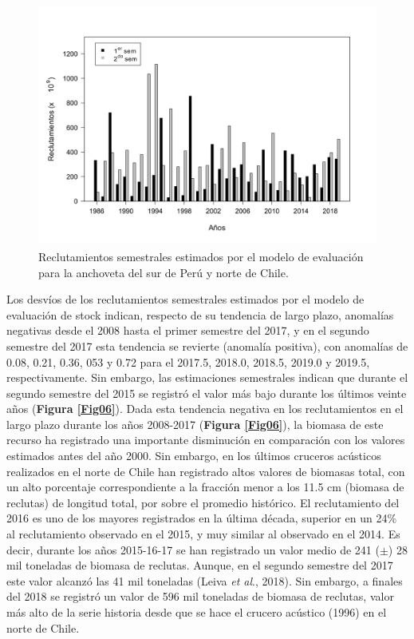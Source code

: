 \documentclass[letter,11pt]{article}
\begin{document}
\vspace{0.5cm}
\begin{figure}[htb!]
 \centering
 \includegraphics[width=12cm,height=8cm]{fig/figura05.pdf}
 \caption{Reclutamientos semestrales estimados por el modelo de evaluaci\'on para la 
 anchoveta del sur de Per\'u y norte de Chile.}
 \label{Fig05}
\end{figure}
\vspace{0.5cm}


Los desv\'ios de los reclutamientos semestrales estimados por el modelo de evaluaci\'on
de stock indican, respecto de su tendencia de largo plazo, anomal\'ias negativas desde
el 2008 hasta el primer semestre del 2017, y en el segundo semestre del 2017 esta tendencia
se revierte (anomal\'ia positiva), con anomal\'ias de 0.08, 0.21, 0.36, 053 y 0.72 para el
2017.5, 2018.0, 2018.5, 2019.0 y 2019.5, respectivamente. Sin embargo, las estimaciones
semestrales indican que durante el segundo semestre del 2015 se registr\'o el valor m\'as bajo
durante los \'ultimos veinte a\~{n}os (\textbf{Figura \ref{Fig06}}). Dada esta tendencia negativa
en los reclutamientos en el largo plazo durante los a\~{n}os 2008-2017 (\textbf{Figura \ref{Fig06}}),
la biomasa de este recurso ha registrado una importante disminuci\'on en comparaci\'on con los
valores estimados antes del a\~{n}o 2000. Sin embargo, en los \'ultimos cruceros ac\'usticos
realizados en el norte de Chile han registrado altos valores de biomasas total, con un alto
porcentaje correspondiente a la fracci\'on menor a los 11.5 cm
(biomasa de reclutas) de longitud total, por sobre el promedio hist\'orico. El reclutamiento del 2016
es uno de los mayores registrados en la \'ultima d\'ecada, superior en un 24\% al reclutamiento observado en el 2015, y muy similar al observado en el 2014. Es decir, durante los a\~{n}os 2015-16-17 se han registrado un valor medio de 241 ($\pm$) 28 mil toneladas de biomasa de reclutas. Aunque,
en el segundo semestre del 2017 este valor alcanz\'o las 41 mil toneladas (Leiva \textit{et al}., 2018). Sin embargo, a finales del 2018 se registr\'o un valor de 596 mil toneladas de biomasa de 
reclutas, valor m\'as alto de la serie historia desde que se hace el crucero ac\'ustico (1996) en el norte de Chile.\\
\end{document}
